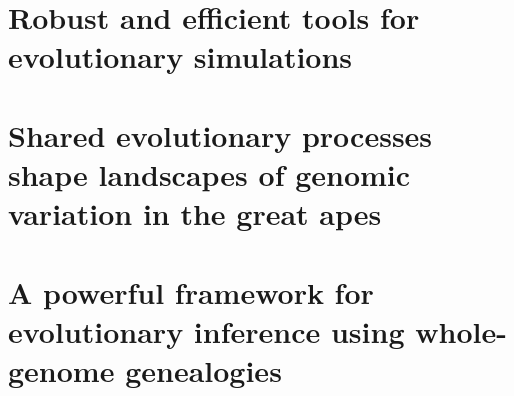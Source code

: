 







\chapter{Robust and efficient tools for evolutionary simulations}


\chapter{Shared evolutionary processes shape landscapes of genomic variation in the great apes} 


\chapter{A powerful framework for evolutionary inference using whole-genome genealogies}








